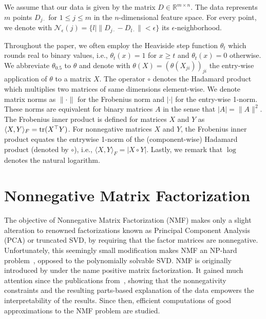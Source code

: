 We assume that our data is given by the matrix $D\in\mathbb{R}^{m\times n}$. The data represents $m$ points $D_{j\cdot}$ for $1\leq j\leq m$ in the $n$-dimensional feature space. For every point, we denote with $\mathcal{N}_\epsilon(j)=\{l| \|D_{j\cdot}-D_{l\cdot}\|<\epsilon\}$ its $\epsilon$-neighborhood.

Throughout the paper, we often employ the Heaviside step function $\theta_t$ which rounds real to binary values, i.e., $\theta_t(x)=1$ for $x\geq t$  and $\theta_t(x)=0$ otherwise. We abbreviate $\theta_{0.5}$ to $\theta$ and denote with $\theta(X)=(\theta(X_{ji}))_{ji}$ the entry-wise application of $\theta$ to a matrix $X$.
The operator $\circ$ denotes the Hadamard product which multiplies two matrices of same dimensions element-wise. 
We denote matrix norms as $\|\cdot\|$ for the Frobenius norm and $|\cdot|$ for the entry-wise 1-norm. These norms are equivalent for binary matrices $A$ in the sense that $|A|=\|A\|^2$. The Frobenius inner product is defined for matrices $X$ and $Y$ as $\langle X,Y\rangle_F=\operatorname*{tr}(X^\top Y)$. For nonnegative matrices $X$ and $Y$, the Frobenius inner product equates the entrywise 1-norm of the (component-wise) Hadamard product (denoted by $\circ$), i.e., $\langle X,Y\rangle_F=|X\circ Y|$. 
Lastly, we remark that $\log$ denotes the natural logarithm. 
\section{Nonnegative Matrix Factorization}
The objective of Nonnegative Matrix Factorization (NMF) makes only a slight alteration to renowned factorizations known as Principal Component Analysis (PCA) or truncated SVD, by requiring that the factor matrices are nonnegative. Unfortunately, this seemingly small modification makes NMF an NP-hard problem~\citep{vavasis2009complexity}, opposed to the polynomially solvable SVD. NMF is originally introduced by \cite{paatero1994positive} under the name positive matrix factorization. It gained much attention since the publications from~\citeauthor{lee1999learning}, showing that the nonnegativity constraints and the resulting parts-based explanation of the data empowers the interpretability of the results. Since then, efficient computations of good approximations to the NMF problem are studied.            

